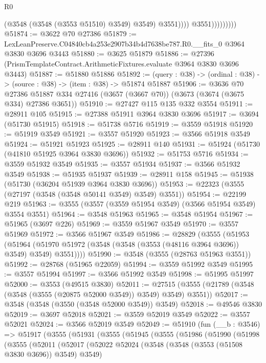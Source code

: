 \begin{lexlean}{R0}
\begin{coremodule}
                              (@3548 (@3548 (@3553 @51510) @3549) @3549)
                              @3551))))
                      @3551)))))))))
@51874 := @3622 @70 @27386
@51879 := LexLeanPreserve.C04840cb4a253e2907b34b4d7638be787.R0.__fits_0 @3964 @3830 @3696 @3443
@51880 := @3625 @51879
@51886 := @27396 (PrismTemplateContract.ArithmeticFixtures.evaluate @3964 @3830 @3696 @3443)
@51887 := @51880 @51886
@51892 := (query : @38) -> (ordinal : @38) -> (source : @38) -> (item : @38) -> @51874 @51887
@51906 := @3636
    @70
    @27386
    @51887
    @334
    @27416
    (@3657 (@3667 @70))
    (@3673 (@3674 (@3675 @334) @27386 @3651))
@51910 := @27427 @115 @135 @332 @3554
@51911 := @28911 @105
@51915 := @27388 @51911 @3964 @3830 @3696
@51917 := @3694 (@51730 @51915)
@51918 := @51738 @5716
@51919 := @3559 @51918
@51920 := @51919 @3549
@51921 := @3557 @51920
@51923 := @3566 @51918 @3549
@51924 := @51921 @51923
@51925 := @28911 @140
@51931 := @51924 (@51730 (@41810 @51925 @3964 @3830 @3696))
@51932 := @51753 @5716
@51934 := @3559 @51932 @3549
@51935 := @3557 @51934
@51937 := @3566 @51932 @3549
@51938 := @51935 @51937
@51939 := @28911 @158
@51945 := @51938 (@51730 (@36204 @51939 @3964 @3830 @3696))
@51953 := @22323 (@3555 (@27197 (@3548 (@3548 @50141 @3549) @3549) @3551))
@51954 := @22199 @219
@51963 := @3555 (@3557 (@3559 @51954 @3549) (@3566 @51954 @3549) @3554 @3551)
@51964 := @3548 @51963
@51965 := @3548 @51954
@51967 := @51965 (@3697 @226)
@51969 := @3559 @51967 @3549
@51970 := @3557 @51969
@51972 := @3566 @51967 @3549
@51986 := @28829
    (@3555
      (@51953
        (@51964 (@51970 @51972 (@3548 (@3548 (@3553 (@48116 @3964 @3696)) @3549) @3549) @3551))))
@51990 := @3548 (@3555 (@28763 @51963 @3551))
@51992 := @28768 (@51965 @22059)
@51994 := @3559 @51992 @3549
@51995 := @3557 @51994
@51997 := @3566 @51992 @3549
@51998 := @51995 @51997
@52000 := @3553 (@49515 @3830)
@52011 := @27515 (@3555 (@21789 (@3548 (@3548 (@3555 (@20875 @52000 @3549)) @3549) @3549) @3551))
@52017 := @3548 (@3548 (@3550 (@3548 @52000 @3549)) @3549)
@52018 := @49546 @3830
@52019 := @3697 @52018
@52021 := @3559 @52019 @3549
@52022 := @3557 @52021
@52024 := @3566 @52019 @3549
@52049 := @51910
    (fun (__b : @3546) =>
    @51917
      (@3555
        (@51931
          (@3555
            (@51945
              (@3555
                (@51986
                  (@51990
                    (@51998
                      (@3555
                        (@52011
                          (@52017
                            (@52022
                              @52024
                              (@3548 (@3548 (@3553 (@51508 @3830 @3696)) @3549) @3549)

\end{coremodule}
\end{lexlean}
